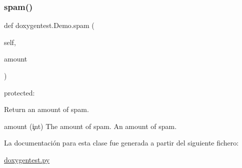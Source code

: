 \subsubsection{\texorpdfstring{spam()}{spam()}}
{\footnotesize\ttfamily def doxygentest.\+Demo.\+spam (\begin{DoxyParamCaption}\item[{}]{self,  }\item[{}]{amount }\end{DoxyParamCaption})}



protected\+: 

\begin{DoxyVerb}Return an amount of spam.

\param amount (\c int) The amount of spam.
\return An amount of spam.
\end{DoxyVerb}
 

La documentación para esta clase fue generada a partir del siguiente fichero\+:\begin{DoxyCompactItemize}
\item 
\hyperlink{doxygentest_8py}{doxygentest.\+py}\end{DoxyCompactItemize}
